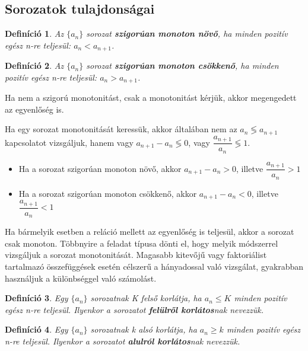 \documentclass[12pt,a4paper]{article}
\newtheorem{definition}{Definíció} [section]
\begin{document}
\subsection{Sorozatok tulajdonságai}

\begin{definition}
Az $\{a_n\}$ sorozat \textbf{szigorúan monoton növő}, ha minden pozitív egész n-re teljesül: $a_n < a_{n + 1}$.
\end{definition}

\begin{definition}
Az $\{a_n\}$ sorozat \textbf{szigorúan monoton csökkenő}, ha minden pozitív egész n-re teljesül: $a_n > a_{n + 1}$.
\end{definition}

Ha nem a szigorú monotonitást, csak a monotonitást kérjük, akkor megengedett az egyenlőség is.

Ha egy sorozat monotonitását keressük, akkor általában nem az $a_n \lessgtr a_{n+1}$ kapcsolatot vizsgáljuk, hanem vagy $a_{n+1}-a_n \lessgtr 0$, vagy $\dfrac{a_{n+1}}{a_n}\lessgtr 1$.


\begin{itemize}
\item Ha a sorozat szigorúan monoton növő, akkor $a_{n+1}-a_n > 0$, illetve $\dfrac{a_{n+1}}{a_n} > 1$
\item Ha a sorozat szigorúan monoton csökkenő, akkor $a_{n+1}-a_n < 0$, illetve $\dfrac{a_{n+1}}{a_n} < 1$
\end{itemize}

Ha bármelyik esetben a reláció mellett az egyenlőség is teljesül, akkor a sorozat csak monoton. Többnyire a feladat típusa dönti el, hogy melyik módszerrel vizsgáljuk a sorozat monotonitását. Magasabb kitevőjű vagy faktoriálist tartalmazó összefüggések esetén célszerű a hányadossal való vizsgálat, gyakrabban használjuk a különbséggel való számolást.

\begin{definition}
Egy $\{a_n\}$ sorozatnak K felső korlátja, ha $a_n \leq K$ minden pozitív egész n-re teljesül. Ilyenkor a sorozatot \textbf{felülről korlátos}nak nevezzük.
\end{definition}

\begin{definition}
Egy $\{a_n\}$ sorozatnak k alsó korlátja, ha $a_n \geq k$ minden pozitív egész n-re teljesül. Ilyenkor a sorozatot \textbf{alulról korlátos}nak nevezzük.
\end{definition}
\end{document}
